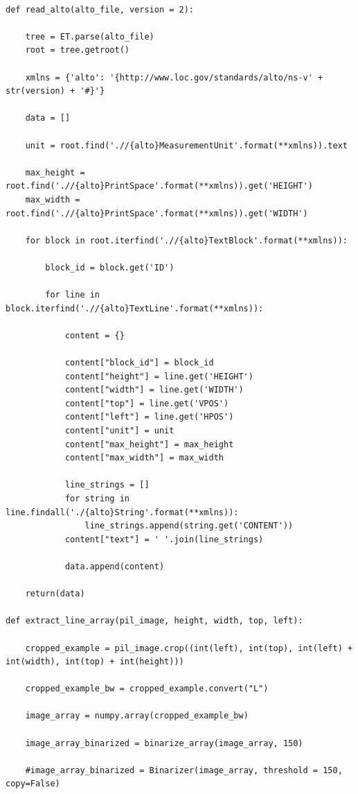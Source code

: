 \documentclass[]{book}
\begin{document}
\begin{verbatim}

def read_alto(alto_file, version = 2):
    
    tree = ET.parse(alto_file)
    root = tree.getroot()

    xmlns = {'alto': '{http://www.loc.gov/standards/alto/ns-v' + str(version) + '#}'}
    
    data = []

    unit = root.find('.//{alto}MeasurementUnit'.format(**xmlns)).text

    max_height = root.find('.//{alto}PrintSpace'.format(**xmlns)).get('HEIGHT')
    max_width = root.find('.//{alto}PrintSpace'.format(**xmlns)).get('WIDTH')

    for block in root.iterfind('.//{alto}TextBlock'.format(**xmlns)):
        
        block_id = block.get('ID')

        for line in block.iterfind('.//{alto}TextLine'.format(**xmlns)):

            content = {}

            content["block_id"] = block_id
            content["height"] = line.get('HEIGHT')
            content["width"] = line.get('WIDTH')
            content["top"] = line.get('VPOS')
            content["left"] = line.get('HPOS')
            content["unit"] = unit
            content["max_height"] = max_height
            content["max_width"] = max_width

            line_strings = []
            for string in line.findall('./{alto}String'.format(**xmlns)):
                line_strings.append(string.get('CONTENT'))
            content["text"] = ' '.join(line_strings)
            
            data.append(content)
        
    return(data)

def extract_line_array(pil_image, height, width, top, left):

    cropped_example = pil_image.crop((int(left), int(top), int(left) + int(width), int(top) + int(height)))

    cropped_example_bw = cropped_example.convert("L")
    
    image_array = numpy.array(cropped_example_bw)

    image_array_binarized = binarize_array(image_array, 150)

    #image_array_binarized = Binarizer(image_array, threshold = 150, copy=False)
    

\end{verbatim}
\end{document}
